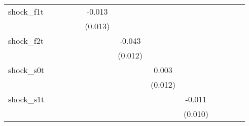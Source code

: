 {\begin{tabular}{l*{12}{c}}
\addlinespace
shock\_f1t   &                     &                     &                     &                     &      -0.013         &                     &                     &                     &                     &                     &                     &                     \\
            &                     &                     &                     &                     &     (0.013)         &                     &                     &                     &                     &                     &                     &                     \\
\addlinespace
shock\_f2t   &                     &                     &                     &                     &                     &      -0.043\sym{***}&                     &                     &                     &                     &                     &                     \\
            &                     &                     &                     &                     &                     &     (0.012)         &                     &                     &                     &                     &                     &                     \\
\addlinespace
shock\_s0t   &                     &                     &                     &                     &                     &                     &       0.003         &                     &                     &                     &                     &                     \\
            &                     &                     &                     &                     &                     &                     &     (0.012)         &                     &                     &                     &                     &                     \\
\addlinespace
shock\_s1t   &                     &                     &                     &                     &                     &                     &                     &      -0.011         &                     &                     &                     &                     \\
            &                     &                     &                     &                     &                     &                     &                     &     (0.010)         &                     &                     &                     &                     \\

\end{tabular}}
